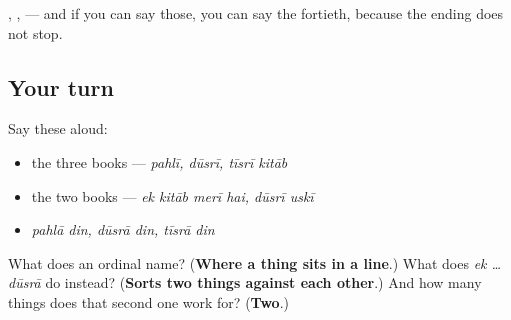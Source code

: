 \textbf{ }, \textbf{ }, \textbf{ } — and if you can say those, you can say the fortieth, because the ending does not stop.

\subsection*{Your turn}
Say these aloud:

\begin{itemize}
\raggedright
  \item the three books — \emph{pahlī, dūsrī, tīsrī kitāb}
  \item the two books — \emph{ek kitāb merī hai, dūsrī uskī}
  \item \emph{pahlā din, dūsrā din, tīsrā din}
\end{itemize}

\begin{tcolorbox}[breakable,colback=teal!4,colframe=teal!35!black,title={Before you move on}]
What does an ordinal name? (\textbf{Where a thing sits in a line}.) What does \emph{ek … dūsrā} do instead? (\textbf{Sorts two things against each other}.) And how many things does that second one work for? (\textbf{Two}.)
\end{tcolorbox}
